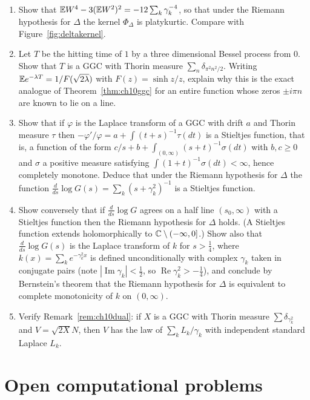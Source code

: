 \begin{enumerate}
\item\label{ex:ch10kurtosis} Show that $\mathbb{E} W^4 - 3(\mathbb{E} W^2)^2 = -12\sum_k\gamma_k^{-4}$, so that under the Riemann hypothesis for $\Delta$ the kernel $\Phi_\Delta$ is platykurtic. Compare with Figure~\ref{fig:deltakernel}.
\item\label{ex:ch10bessel} Let $T$ be the hitting time of $1$ by a three dimensional Bessel process from $0$. Show that $T$ is a GGC with Thorin measure $\sum_n\delta_{\pi^2n^2/2}$. Writing $\mathbb{E} e^{-\lambda T} = 1/F(\sqrt{2\lambda})$ with $F(z) = \sinh z/z$, explain why this is the exact analogue of Theorem~\ref{thm:ch10ggc} for an entire function whose zeros $\pm i\pi n$ are known to lie on a line.
\item\label{ex:ch10stieltjes} Show that if $\varphi$ is the Laplace transform of a GGC with drift $a$ and Thorin measure $\tau$ then $-\varphi'/\varphi = a+\int(t+s)^{-1}\tau(dt)$ is a Stieltjes function, that is, a function of the form $c/s+b+\int_{(0,\infty)}(s+t)^{-1}\sigma(dt)$ with $b,c\ge0$ and $\sigma$ a positive measure satisfying $\int(1+t)^{-1}\sigma(dt)<\infty$, hence completely monotone. Deduce that under the Riemann hypothesis for $\Delta$ the function $\frac{d}{ds}\log G(s) = \sum_k(s+\gamma_k^2)^{-1}$ is a Stieltjes function.
\item\label{ex:ch10cm} Show conversely that if $\frac{d}{ds}\log G$ agrees on a half line $(s_0,\infty)$ with a Stieltjes function then the Riemann hypothesis for $\Delta$ holds. (A Stieltjes function extends holomorphically to $\mathbb{C}\setminus(-\infty,0]$.) Show also that $\frac{d}{ds}\log G(s)$ is the Laplace transform of $k$ for $s>\frac14$, where $k(x) = \sum_ke^{-\gamma_k^2x}$ is defined unconditionally with complex $\gamma_k$ taken in conjugate pairs (note $|\operatorname{Im}\gamma_k|<\frac12$, so $\operatorname{Re}\gamma_k^2>-\frac14$), and conclude by Bernstein's theorem that the Riemann hypothesis for $\Delta$ is equivalent to complete monotonicity of $k$ on $(0,\infty)$.
\item Verify Remark~\ref{rem:ch10dual}: if $X$ is a GGC with Thorin measure $\sum\delta_{\gamma_k^2}$ and $V = \sqrt{2X}N$, then $V$ has the law of $\sum_kL_k/\gamma_k$ with independent standard Laplace $L_k$.
\end{enumerate}

\section{Open computational problems}

